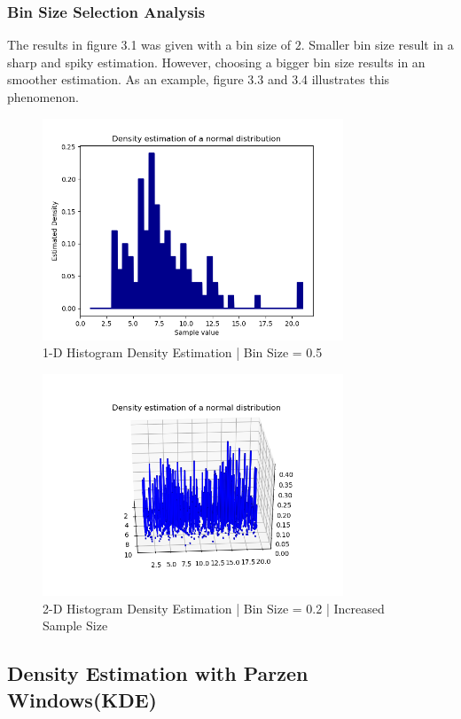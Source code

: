 \documentclass[12pt]{article}
\numberwithin{equation}{section}
\numberwithin{table}{section}
\numberwithin{figure}{section}
\begin{document}
\subsubsection{Bin Size Selection Analysis}
The results in figure 3.1 was given with a bin size of $2$. Smaller bin size result in a sharp and spiky estimation. However, choosing a bigger bin size results in an smoother estimation. As an example, figure 3.3 and 3.4 illustrates this phenomenon.
	\begin{figure}[!h]\centering
	\includegraphics[width=0.8\textwidth]{3_a_3.PNG}
	\caption{1-D Histogram Density Estimation | Bin Size = 0.5}
	\label{pl1}
\end{figure}

	\begin{figure}[!h]\centering
	\includegraphics[width=0.8\textwidth]{3_a_4.PNG}
	\caption{2-D Histogram Density Estimation | Bin Size = 0.2 | Increased Sample Size}
	\label{pl1}
\end{figure}
\subsection*{Density Estimation with Parzen Windows(KDE)}
\end{document}
